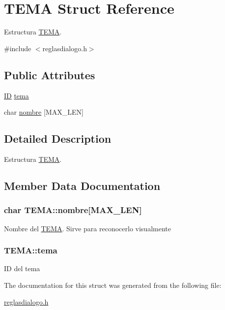 \hypertarget{structTEMA}{
\section{TEMA Struct Reference}
\label{structTEMA}
}


Estructura \hyperlink{structTEMA}{TEMA}.  




{\ttfamily \#include $<$reglasdialogo.h$>$}

\subsection*{Public Attributes}
\begin{DoxyCompactItemize}
\item 
\hyperlink{tipos_8h_a483fb3895d39b2ee95d50073243d077e}{ID} \hyperlink{structTEMA_afc090de701e6e680e8eadeed006b5997}{tema}
\item 
char \hyperlink{structTEMA_a885e7999d6cc259947f774641ab728a7}{nombre} \mbox{[}MAX\_\-LEN\mbox{]}
\end{DoxyCompactItemize}


\subsection{Detailed Description}
Estructura \hyperlink{structTEMA}{TEMA}. 

\subsection{Member Data Documentation}
\hypertarget{structTEMA_a885e7999d6cc259947f774641ab728a7}{
\subsubsection[{nombre}]{\setlength{\rightskip}{0pt plus 5cm}char {\bf TEMA::nombre}\mbox{[}MAX\_\-LEN\mbox{]}}}
\label{structTEMA_a885e7999d6cc259947f774641ab728a7}
Nombre del \hyperlink{structTEMA}{TEMA}. Sirve para reconocerlo visualmente \hypertarget{structTEMA_afc090de701e6e680e8eadeed006b5997}{
\subsubsection[{tema}]{ {\bf TEMA::tema}}}
\label{structTEMA_afc090de701e6e680e8eadeed006b5997}
ID del tema 

The documentation for this struct was generated from the following file:\begin{DoxyCompactItemize}
\item 
\hyperlink{reglasdialogo_8h}{reglasdialogo.h}\end{DoxyCompactItemize}
